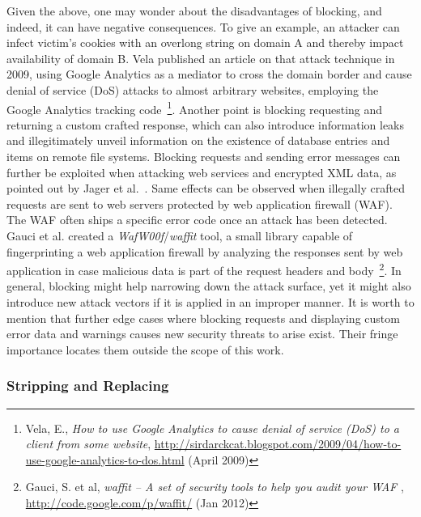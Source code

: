     Given the above, one may wonder about the disadvantages of blocking, and indeed, it can have negative consequences. To give an example, an attacker can infect victim's cookies with an overlong string on domain A and thereby impact availability of domain B. Vela published an article on that attack technique in 2009, using Google Analytics as a mediator to cross the domain border and cause denial of service (DoS) attacks to almost arbitrary websites, employing the Google Analytics tracking code~\footnote{Vela, E., \textit{How to use Google Analytics to cause denial of service (DoS) to a client from some website}, \url{http://sirdarckcat.blogspot.com/2009/04/how-to-use-google-analytics-to-dos.html} (April 2009)}. Another point is blocking requesting and returning a custom crafted response, which can also introduce information leaks and illegitimately unveil information on the existence of database entries and items on remote file systems. Blocking requests and sending error messages can further be exploited 
when attacking web services and encrypted XML data, as pointed out by Jager et al.~\cite{jager2011break}. Same effects can be observed when illegally crafted requests are sent to web servers protected by web application firewall (WAF). The WAF often ships a specific error code once an attack has been detected. Gauci et al. created a \textit{WafW00f}/\textit{waffit} tool, a small library capable of fingerprinting a web application firewall by analyzing the responses sent by web application in case malicious data is part of the request headers and body~\footnote{Gauci, S. et al, \textit{waffit -- A set of security tools to help you audit your WAF }, \url{http://code.google.com/p/waffit/} (Jan 2012)}. In general, blocking might help narrowing down the attack surface, yet it might also introduce new attack vectors if it is applied in an improper manner. It is worth to mention that further edge cases where blocking requests and displaying custom error data and warnings causes new security threats to arise exist. 
Their fringe importance locates them outside the scope of this work.  

    \subsubsection{Stripping and Replacing}
    \label{subsubsec:4.3.2.stripping_and_replacing}

